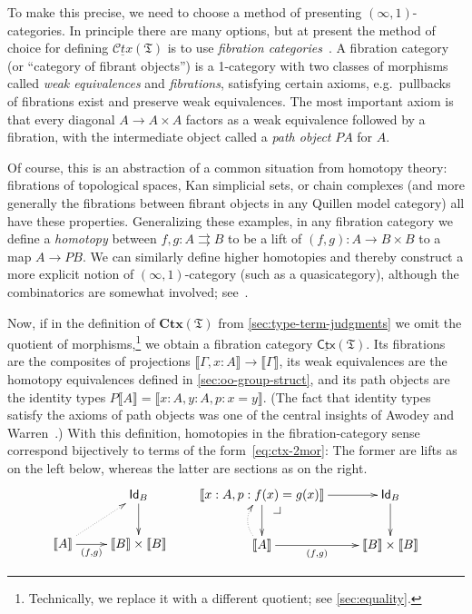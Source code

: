 \documentclass[12pt]{article}
\makeatletter
\newcommand{\pullback}[1][dr]{\save*!/#1-1.7pc/#1:(-1,1)@^{|-}\restore}
\def\oo{\ensuremath{\infty}}
\def\io{\ensuremath{(\oo,1)}}
\def\m#1{\llbracket#1\rrbracket}
\def\Id{\mathsf{Id}}
\def\fT{\mathfrak{T}}
\def\CtxT{\mathbf{Ctx}(\fT)}
\def\cCtx{\underline{\mathscr{C}\!\mathit{tx}}}
\def\cCtxT{\cCtx(\fT)}
\def\sCtx{\underline{\mathsf{Ctx}}}
\def\sCtxT{\sCtx(\fT)}
\numberwithin{equation}{section}
\makeatother
\begin{document}
\begin{subappendices}
To make this precise, we need to choose a method of presenting \io-categories.
In principle there are many options, but at present the method of choice for defining $\cCtxT$ is to use \emph{fibration categories}~\cite{brown:ahtgsc}.
A fibration category (or ``category of fibrant objects'') is a 1-category with two classes of morphisms called \emph{weak equivalences} and \emph{fibrations}, satisfying certain axioms, e.g.\ pullbacks of fibrations exist and preserve weak equivalences.
The most important axiom is that every diagonal $A \to A\times A$ factors as a weak equivalence followed by a fibration, with the intermediate object called a \emph{path object} $P A$ for $A$.

Of course, this is an abstraction of a common situation from homotopy theory: fibrations of topological spaces, Kan simplicial sets, or chain complexes (and more generally the fibrations between fibrant objects in any Quillen model category) all have these properties.
Generalizing these examples, in any fibration category we define a \emph{homotopy} between $f,g:A\rightrightarrows B$ to be a lift of $(f,g):A \to B\times B$ to a map $A \to P B$.
We can similarly define higher homotopies and thereby construct a more explicit notion of \io-category (such as a quasicategory), although the combinatorics are somewhat involved; see~\cite{szumilo:hothy-ccplhot}.

Now, if in the definition of $\CtxT$ from \cref{sec:type-term-judgments} we omit the quotient of morphisms,\footnote{Technically, we replace it with a different quotient; see \cref{sec:equality}.} we obtain a fibration category $\sCtxT$.
Its fibrations are the composites of projections $\m{\Gamma,x:A} \to \m\Gamma$, its weak equivalences are the homotopy equivalences defined in \cref{sec:oo-group-struct}, and its path objects are the identity types $P\m A = \m{x:A, y:A, p:x=y}$.
(The fact that identity types satisfy the axioms of path objects was one of the central insights of Awodey and Warren~\cite{aw:htpy-idtype,warren:thesis}.)
With this definition, homotopies in the fibration-category sense correspond bijectively to terms of the form~\eqref{eq:ctx-2mor}: %
The former are lifts as on the left below, whereas the latter are sections as on the right.
\[\xymatrix{ & \Id_B \ar[d] \\ \m A \ar[r]_-{(f,g)} \ar@{.>}[ur] & \m B \times \m B }\qquad
\xymatrix{\m{x:A, p:f(x)=g(x)} \ar[d] \ar[r] \pullback & \Id_B \ar[d] \\ \m A \ar[r]_-{(f,g)} \ar@{.>}@/^4mm/[u] & \m B \times \m B }
\]


\end{subappendices}
\end{document}
